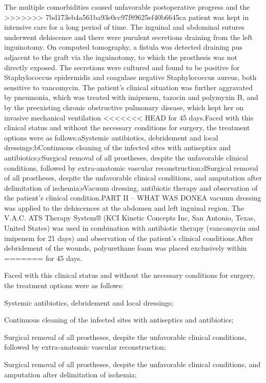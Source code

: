 \documentclass[numberinsection,times,10pt,spreadimages]{memoir}
\begin{document}
The multiple comorbidities caused unfavorable postoperative progress and the
>>>>>>> 7bd173eb4a561ba93e0cc97f89625ef40b6645ca
patient was kept in intensive care for a long period of time. The inguinal and
abdominal sutures underwent dehiscence and there were purulent secretions
draining from the left inguinotomy. On computed tomography, a fistula was
detected draining pus adjacent to the graft via the inguinotomy, to which the
prosthesis was not directly exposed. The secretions were cultured and found to
be positive for Staphylococcus epidermidis and coagulase
negative Staphylococcus aureus, both sensitive to vancomycin.
The patient’s clinical situation was further aggravated by pneumonia, which was
treated with imipenem, tazocin and polymyxin B, and by the preexisting chronic
obstructive pulmonary disease, which kept her on invasive mechanical ventilation
<<<<<<< HEAD
for 45 days.Faced with this clinical status and without the necessary conditions
for surgery,
the treatment options were as follows:aSystemic antibiotics, debridement and
local dressings;bContinuous cleaning of the infected sites with antiseptics and
antibiotics;cSurgical removal of all prostheses, despite the unfavorable
clinical
conditions, followed by extra-anatomic vascular reconstruction;dSurgical removal
of all prostheses, despite the unfavorable clinical
conditions, and amputation after delimitation of ischemia;eVacuum dressing,
antibiotic therapy and observation of the patient’s
clinical condition.PART II – WHAT WAS DONEA vacuum dressing was applied to the
dehiscences at the abdomen and left inguinal
region. The V.A.C. ATS Therapy System® (KCI Kinetic Concepts Inc, San Antonio,
Texas, United States) was used in combination with antibiotic therapy
(vancomycin and imipenem for 21 days) and observation of the patient’s clinical
conditions.After debridement of the wounds, polyurethane foam was placed
exclusively within
=======
for 45 days.

Faced with this clinical status and without the necessary conditions for
surgery,
the treatment options were as follows:

Systemic antibiotics, debridement and local dressings;

Continuous cleaning of the infected sites with antiseptics and
antibiotics;

Surgical removal of all prostheses, despite the unfavorable clinical
conditions, followed by extra-anatomic vascular reconstruction;

Surgical removal of all prostheses, despite the unfavorable clinical
conditions, and amputation after delimitation of ischemia;
\end{document}
